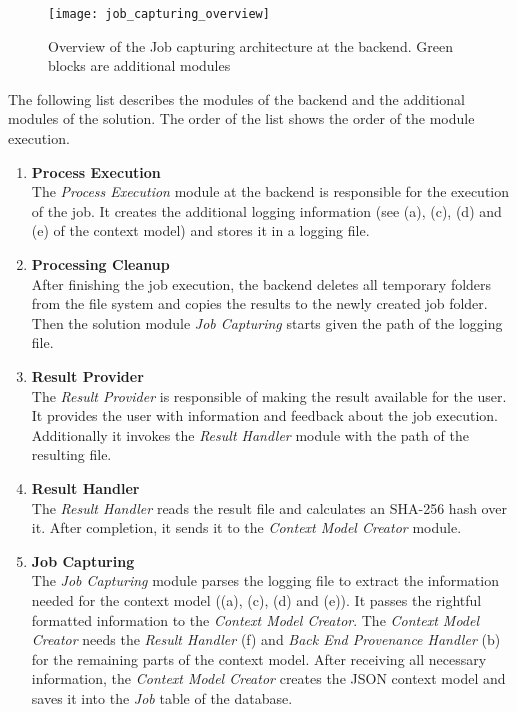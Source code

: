 \documentclass[draft,final]{vutinfth} %
\begin{document}
\begin{figure}[h]
	\centering
	\texttt{[image: job\_capturing\_overview]}
	\caption{Overview of the Job capturing architecture at the backend. Green blocks are additional modules}
	\label{fig:impljobcapture} %
\end{figure}
\newpage
The following list describes the modules of the backend and the additional modules of the solution. The order of the list shows the order of the module execution. 

\begin{enumerate}
	\item \textbf{Process Execution} \\
	The \textit{Process Execution} module at the backend is responsible for the execution of the job. It creates the additional logging information (see (a), (c), (d) and (e) of the context model) and stores it in a logging file. 
	\item \textbf{Processing Cleanup} \\
	After finishing the job execution, the backend deletes all temporary folders from the file system and copies the results to the newly created job folder. Then the solution module \textit{Job Capturing} starts given the path of the logging file.  
	\item \textbf{Result Provider} \\
	The \textit{Result Provider} is responsible of making the result available for the user. It provides the user with information and feedback about the job execution. Additionally it invokes the \textit{Result Handler} module with the path of the resulting file.
	\item \textbf{Result Handler} \\
	The \textit{Result Handler} reads the result file and calculates an SHA-256 hash over it. After completion, it sends it to the \textit{Context Model Creator} module.  
	\item \textbf{Job Capturing} \\
	The \textit{Job Capturing} module parses the logging file to extract the information needed for the context model ((a), (c), (d) and (e)). It passes the rightful formatted information to the \textit{Context Model Creator}. The \textit{Context Model Creator} needs the \textit{Result Handler} (f) and \textit{Back End Provenance Handler} (b) for the remaining parts of the context model. After receiving all necessary information, the \textit{Context Model Creator} creates the JSON context model and saves it into the \textit{Job} table of the database.    
\end{enumerate}
\end{document}
